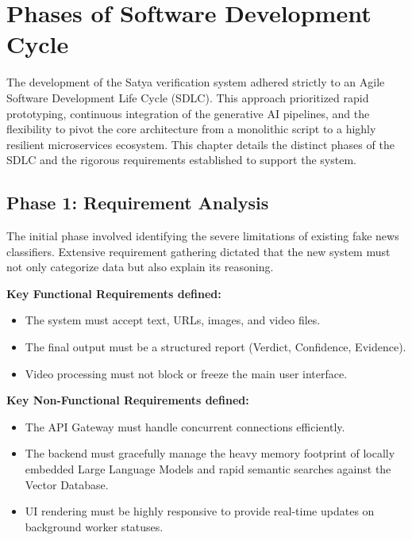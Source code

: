 \chapter{Phases of Software Development Cycle}

The development of the Satya verification system adhered strictly to an Agile Software Development Life Cycle (SDLC). This approach prioritized rapid prototyping, continuous integration of the generative AI pipelines, and the flexibility to pivot the core architecture from a monolithic script to a highly resilient microservices ecosystem. This chapter details the distinct phases of the SDLC and the rigorous requirements established to support the system.

\section{Phase 1: Requirement Analysis}
The initial phase involved identifying the severe limitations of existing fake news classifiers. Extensive requirement gathering dictated that the new system must not only categorize data but also explain its reasoning. 

\textbf{Key Functional Requirements defined:}
\begin{itemize}
    \item The system must accept text, URLs, images, and video files.
    \item The final output must be a structured report (Verdict, Confidence, Evidence).
    \item Video processing must not block or freeze the main user interface.
\end{itemize}

\textbf{Key Non-Functional Requirements defined:}
\begin{itemize}
    \item The API Gateway must handle concurrent connections efficiently.
    \item The backend must gracefully manage the heavy memory footprint of locally embedded Large Language Models and rapid semantic searches against the Vector Database.
    \item UI rendering must be highly responsive to provide real-time updates on background worker statuses.
\end{itemize}

